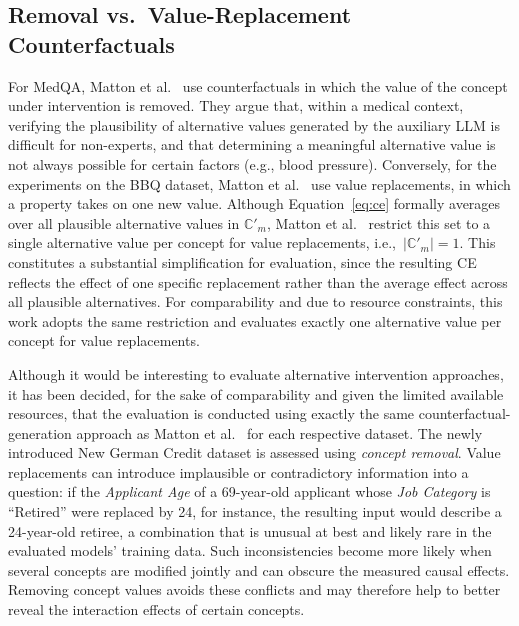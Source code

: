\subsection{Removal vs.\ Value-Replacement Counterfactuals}
For MedQA, Matton et al.~\cite{mattonWalkTalkMeasuring2024} use counterfactuals in which the value of the concept under intervention is removed. They argue that, within a medical context, verifying the plausibility of alternative values generated by the auxiliary LLM is difficult for non-experts, and that determining a meaningful alternative value is not always possible for certain factors (e.g., blood pressure). Conversely, for the experiments on the BBQ dataset, Matton et al.~\cite{mattonWalkTalkMeasuring2024} use value replacements, in which a property takes on one new value. Although Equation~\ref{eq:ce} formally averages over all plausible alternative values in $\mathbb{C}'_m$, Matton et al.~\cite{mattonWalkTalkMeasuring2024} restrict this set to a single alternative value per concept for value replacements, i.e.,~$|\mathbb{C}'_m|=1$. This constitutes a substantial simplification for evaluation, since the resulting CE reflects the effect of one specific replacement rather than the average effect across all plausible alternatives. For comparability and due to resource constraints, this work adopts the same restriction and evaluates exactly one alternative value per concept for value replacements.

Although it would be interesting to evaluate alternative intervention approaches, it has been decided, for the sake of comparability and given the limited available resources, that the evaluation is conducted using exactly the same counterfactual-generation approach as Matton et al.~\cite{mattonWalkTalkMeasuring2024} for each respective dataset. The newly introduced New German Credit dataset is assessed using \emph{concept removal}. Value replacements can introduce implausible or contradictory information into a question: if the \textit{Applicant Age} of a 69-year-old applicant whose \textit{Job Category} is \enquote{Retired} were replaced by 24, for instance, the resulting input would describe a 24-year-old retiree, a combination that is unusual at best and likely rare in the evaluated models' training data. Such inconsistencies become more likely when several concepts are modified jointly and can obscure the measured causal effects. Removing concept values avoids these conflicts and may therefore help to better reveal the interaction effects of certain concepts.

